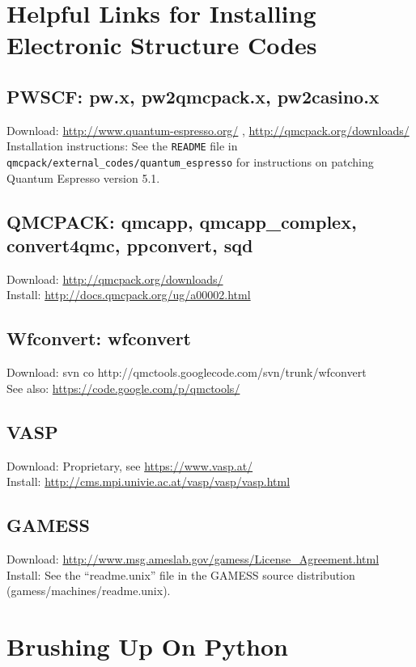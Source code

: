 \documentclass[oneside,11pt]{memoir}
\numberwithin{equation}{section}
\begin{document}
\section{Helpful Links for Installing Electronic Structure Codes} \label{sec:install_code}
\subsection{PWSCF: pw.x, pw2qmcpack.x, pw2casino.x}
  Download: \url{http://www.quantum-espresso.org/} , \url{http://qmcpack.org/downloads/} \\
  Installation instructions: See the \texttt{README} file in \texttt{qmcpack/external\_codes/quantum\_espresso} for instructions on patching Quantum Espresso version 5.1.

\subsection{QMCPACK: qmcapp, qmcapp\_complex, convert4qmc, ppconvert, sqd}
  Download: \url{http://qmcpack.org/downloads/}\\ 
  Install: \url{http://docs.qmcpack.org/ug/a00002.html}

\subsection{Wfconvert: wfconvert}
  Download: svn co http://qmctools.googlecode.com/svn/trunk/wfconvert \\
  See also: \url{https://code.google.com/p/qmctools/}

\subsection{VASP}
  Download: Proprietary, see \url{https://www.vasp.at/} \\
  Install: \url{http://cms.mpi.univie.ac.at/vasp/vasp/vasp.html}

\subsection{GAMESS}
  Download: \url{http://www.msg.ameslab.gov/gamess/License_Agreement.html}
  Install: See the ``readme.unix'' file in the GAMESS source distribution (gamess/machines/readme.unix).


\section{Brushing Up On Python}\label{sec:learn_python}
\end{document}

